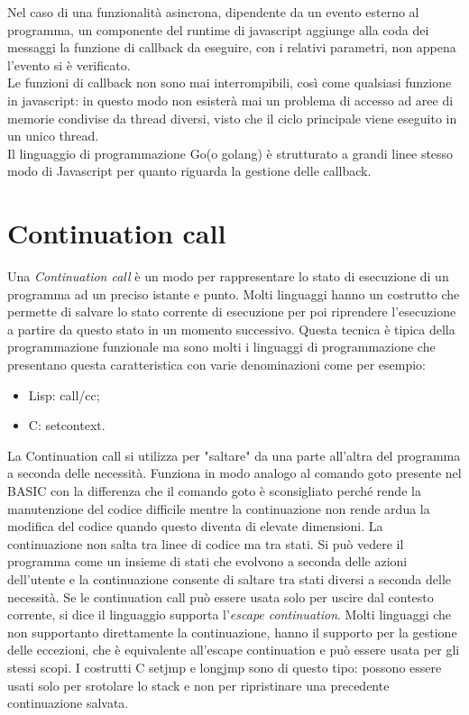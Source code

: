 \documentclass[10pt,a4paper,italian]{report}
\begin{document}
\noindent Nel caso di una funzionalità asincrona, dipendente da un evento esterno al programma, un componente del runtime di javascript aggiunge alla coda dei messaggi la funzione di callback da eseguire, con i relativi parametri, non appena l'evento si è verificato.\\

\noindent Le funzioni di callback non sono mai interrompibili, così come qualsiasi funzione in javascript: in questo modo non esisterà mai un problema di accesso ad aree di memorie condivise da thread diversi, visto che il ciclo principale viene eseguito in un unico thread.\\

\noindent Il linguaggio di programmazione Go(o golang) è strutturato a grandi linee stesso modo di Javascript per quanto riguarda la gestione delle callback.

\section{Continuation call}
Una \textit{Continuation call} è un modo per rappresentare lo stato di esecuzione di un programma ad un preciso istante e punto. Molti linguaggi hanno un costrutto che permette di salvare lo stato corrente di esecuzione per poi riprendere l'esecuzione a partire da questo stato in un momento successivo. Questa tecnica è tipica della programmazione funzionale ma sono molti i linguaggi di programmazione che presentano questa caratteristica con varie denominazioni come per esempio:
\begin{itemize}
	\item Lisp: call/cc;
	\item C: setcontext.
\end{itemize}
La Continuation call si utilizza per "saltare" da una parte all'altra del programma  a seconda delle necessità. Funziona in modo analogo al comando goto presente nel BASIC con la differenza che il comando goto è sconsigliato perché rende la manutenzione del codice difficile mentre la continuazione non rende ardua la modifica del codice quando questo diventa di elevate dimensioni. La continuazione non salta tra linee di codice ma tra stati. Si può vedere il programma come un insieme di stati che evolvono a seconda delle azioni dell'utente e la continuazione consente di saltare tra stati diversi a seconda delle necessità.
Se le continuation call può essere usata solo per uscire dal contesto corrente, si dice il linguaggio supporta l'\textit{escape continuation}. Molti linguaggi che non supportanto direttamente la continuazione, hanno il supporto per la gestione delle eccezioni, che è equivalente all'escape continuation e può essere usata per gli stessi scopi. I costrutti C setjmp e longjmp sono di questo tipo: possono essere usati solo per srotolare lo stack e non per ripristinare una precedente continuazione salvata.
\end{document}
